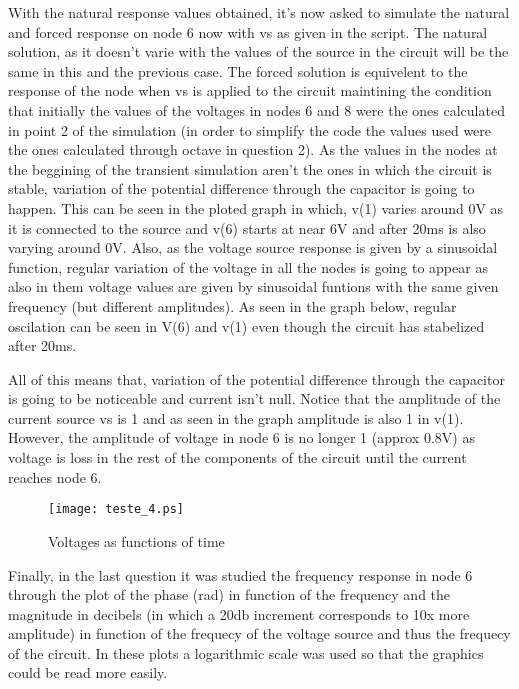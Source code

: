 \par With the natural response values obtained, it's now asked to simulate the natural and forced response on node 6 now with vs as given in the script. The natural solution, as it doesn't varie with the values of the source in the circuit will be the same in this and the previous case. The forced solution is equivelent to the response of the node when vs is applied to the circuit maintining the condition that initially the values of the voltages in nodes 6 and 8 were the ones calculated in point 2 of the simulation (in order to simplify the code the values used were the ones calculated through octave in question 2). As the values in the nodes at the beggining of the transient simulation aren't the ones in which the circuit is stable, variation of the potential difference through the capacitor is going to happen. This can be seen in the ploted graph in which, v(1) varies around 0V as it is connected to the source and v(6) starts at near 6V and after 20ms is also varying around 0V. Also, as the voltage source response is given by a sinusoidal function, regular variation of the voltage in all the nodes is going to appear as also in them voltage values are given by sinusoidal funtions with the same given frequency (but different amplitudes). As seen in the graph below, regular oscilation can be seen in V(6) and v(1) even though the circuit has stabelized after 20ms.
\par All of this means that, variation of the potential difference through the capacitor is going to be noticeable and current isn't null. Notice that the amplitude of the current source vs is 1 and as seen in the graph amplitude is also 1 in v(1). However, the amplitude of voltage in node 6 is no longer 1 (approx 0.8V) as voltage is loss in the rest of the components of the circuit until the current reaches node 6. 

\begin{figure}[h] \centering
\texttt{[image: teste\_4.ps]}
\caption{Voltages as functions of time}
\label{fig:V(t)}
\end{figure}

\par Finally, in the last question it was studied the frequency response in node 6 through the plot of the phase (rad) in function of the frequency and the magnitude in decibels (in which a 20db increment corresponds to 10x more amplitude) in function of the frequecy of the voltage source and thus the frequecy of the circuit. In these plots a logarithmic scale was used so that the graphics could be read more easily. 

